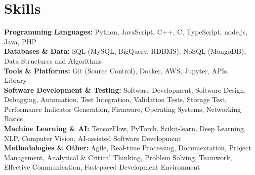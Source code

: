 \documentclass[a4paper,10pt]{article}
\begin{document}
\section*{Skills}
\textbf{Programming Languages:} Python, JavaScript, C++, C, TypeScript, node.js, Java, PHP \\
\textbf{Databases \& Data:} SQL (MySQL, BigQuery, RDBMS), NoSQL (MongoDB), Data Structures and Algorithms \\
\textbf{Tools \& Platforms:} Git (Source Control), Docker, AWS, Jupyter, APIs, Library \\
\textbf{Software Development \& Testing:} Software Development, Software Design, Debugging, Automation, Test Integration, Validation Tests, Storage Test, Performance Indicator Generation, Firmware, Operating Systems, Networking Basics \\
\textbf{Machine Learning \& AI:} TensorFlow, PyTorch, Scikit-learn, Deep Learning, NLP, Computer Vision, AI-assisted Software Development \\
\textbf{Methodologies \& Other:} Agile, Real-time Processing, Documentation, Project Management, Analytical \& Critical Thinking, Problem Solving, Teamwork, Effective Communication, Fast-paced Development Environment \\

\vspace{-4mm}
\end{document}
